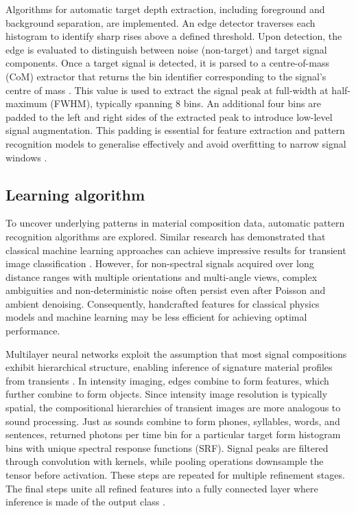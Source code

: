 \documentclass[12pt,a4paper,oneside]{report}
\begin{document}
Algorithms for automatic target depth extraction, including foreground and background separation, are implemented. An edge detector traverses each histogram to identify sharp rises above a defined threshold. Upon detection, the edge is evaluated to distinguish between noise (non-target) and target signal components. Once a target signal is detected, it is parsed to a centre-of-mass (CoM) extractor that returns the bin identifier corresponding to the signal's centre of mass \cite{erdogan2017,zhang2019}. This value is used to extract the signal peak at full-width at half-maximum (FWHM), typically spanning 8 bins. An additional four bins are padded to the left and right sides of the extracted peak to introduce low-level signal augmentation. This padding is essential for feature extraction and pattern recognition models to generalise effectively and avoid overfitting to narrow signal windows \cite{su2016,becker2023}.

\subsection{Learning algorithm}
\label{subsec:learning_algorithm}

To uncover underlying patterns in material composition data, automatic pattern recognition algorithms are explored. Similar research has demonstrated that classical machine learning approaches can achieve impressive results for transient image classification \cite{su2016,becker2023}. However, for non-spectral signals acquired over long distance ranges with multiple orientations and multi-angle views, complex ambiguities and non-deterministic noise often persist even after Poisson and ambient denoising. Consequently, handcrafted features for classical physics models and machine learning may be less efficient for achieving optimal performance.

Multilayer neural networks exploit the assumption that most signal compositions exhibit hierarchical structure, enabling inference of signature material profiles from transients \cite{jungerman2022}. In intensity imaging, edges combine to form features, which further combine to form objects. Since intensity image resolution is typically spatial, the compositional hierarchies of transient images are more analogous to sound processing. Just as sounds combine to form phones, syllables, words, and sentences, returned photons per time bin for a particular target form histogram bins with unique spectral response functions (SRF). Signal peaks are filtered through convolution with kernels, while pooling operations downsample the tensor before activation. These steps are repeated for multiple refinement stages. The final steps unite all refined features into a fully connected layer where inference is made of the output class \cite{lecun1998}.
\end{document}
